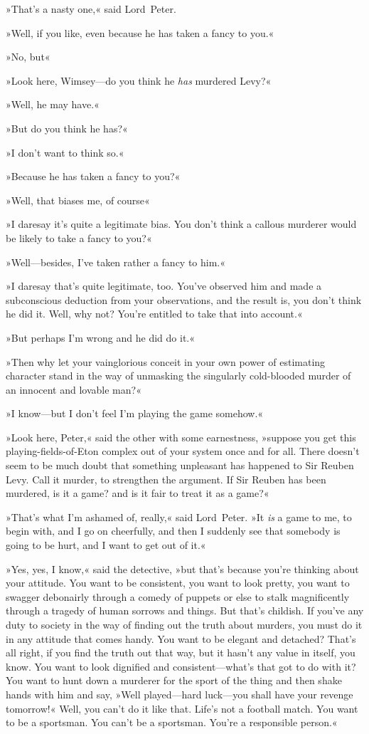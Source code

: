 »That's a nasty one,« said Lord~Peter.

»Well, if you like, even because he has taken a fancy to you.«

»No, but\longdash«

»Look here, Wimsey—do you think he \textit{has} murdered Levy?«

»Well, he may have.«

»But do you think he has?«

»I don't want to think so.«

»Because he has taken a fancy to you?«

»Well, that biases me, of course\longdash«

»I daresay it's quite a legitimate bias. You don't think a callous murderer would be likely to take a fancy to you?«

»Well—besides, I've taken rather a fancy to him.«

»I daresay that's quite legitimate, too. You've observed him and made a subconscious deduction from your observations, and the result is, you don't think he did it. Well, why not? You're entitled to take that into account.«

»But perhaps I'm wrong and he did do it.«

»Then why let your vainglorious conceit in your own power of estimating character stand in the way of unmasking the singularly cold-blooded murder of an innocent and lovable man?«

»I know—but I don't feel I'm playing the game somehow.«

»Look here, Peter,« said the other with some earnestness, »suppose you get this playing-fields-of-Eton complex out of your system once and for all. There doesn't seem to be much doubt that something unpleasant has happened to Sir Reuben Levy. Call it murder, to strengthen the argument. If Sir Reuben has been murdered, is it a game? and is it fair to treat it as a game?«

»That's what I'm ashamed of, really,« said Lord~Peter. »It \textit{is} a game to me, to begin with, and I go on cheerfully, and then I suddenly see that somebody is going to be hurt, and I want to get out of it.«

»Yes, yes, I know,« said the detective, »but that's because you're thinking about your attitude. You want to be consistent, you want to look pretty, you want to swagger debonairly through a comedy of puppets or else to stalk magnificently through a tragedy of human sorrows and things. But that's childish. If you've any duty to society in the way of finding out the truth about murders, you must do it in any attitude that comes handy. You want to be elegant and detached? That's all right, if you find the truth out that way, but it hasn't any value in itself, you know. You want to look dignified and consistent—what's that got to do with it? You want to hunt down a murderer for the sport of the thing and then shake hands with him and say, »Well played—hard luck—you shall have your revenge tomorrow!« Well, you can't do it like that. Life's not a football match. You want to be a sportsman. You can't be a sportsman. You're a responsible person.«

